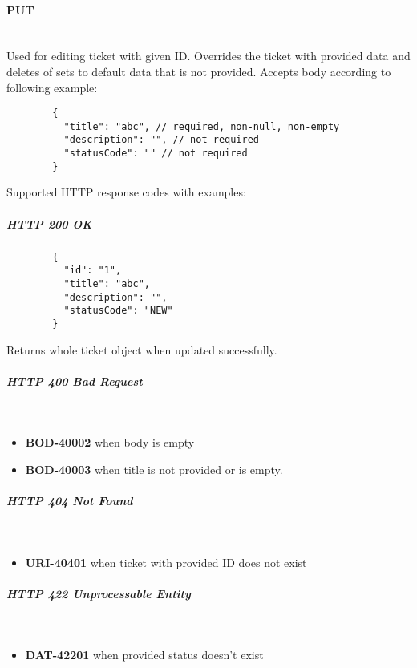 \documentclass[a4paper]{article}
\newcommand{\newLineParagraph}[1]{\paragraph{#1}\mbox{}\\}
\newcommand{\newLineSubParagraph}[1]{\subparagraph{#1}\mbox{}\\}
\begin{document}
    \newLineParagraph{PUT}
    Used for editing ticket with given ID. Overrides the ticket with provided data and deletes of sets to default data that is not provided. Accepts body according to following example:
    \begin{verbatim}
        {
          "title": "abc", // required, non-null, non-empty
          "description": "", // not required
          "statusCode": "" // not required
        }
    \end{verbatim}
    Supported HTTP response codes with examples:
    \subparagraph{HTTP 200 OK}
    \begin{verbatim}
        {
          "id": "1",
          "title": "abc",
          "description": "",
          "statusCode": "NEW"
        }
    \end{verbatim}
    Returns whole ticket object when updated successfully.
    \newLineSubParagraph{HTTP 400 Bad Request}
    \begin{itemize}
        \item \textbf{BOD-40002} when body is empty
        \item \textbf{BOD-40003} when title is not provided or is empty.
    \end{itemize}
    \newLineSubParagraph{HTTP 404 Not Found}
    \begin{itemize}
        \item \textbf{URI-40401} when ticket with provided ID does not exist
    \end{itemize}
    \newLineSubParagraph{HTTP 422 Unprocessable Entity}
    \begin{itemize}
        \item \textbf{DAT-42201} when provided status doesn't exist
    \end{itemize}
\end{document}
